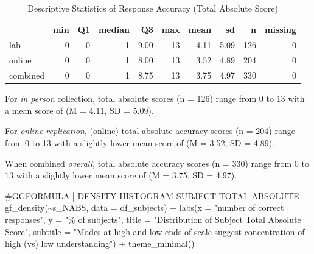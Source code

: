 \documentclass[
  letterpaper,
  DIV=11,
  numbers=noendperiod]{scrreprt}
\newenvironment{Shaded}{\begin{snugshade}}{\end{snugshade}}
\newcommand{\AttributeTok}[1]{\textcolor[rgb]{0.40,0.45,0.13}{#1}}
\newcommand{\CommentTok}[1]{\textcolor[rgb]{0.37,0.37,0.37}{#1}}
\newcommand{\FunctionTok}[1]{\textcolor[rgb]{0.28,0.35,0.67}{#1}}
\newcommand{\NormalTok}[1]{\textcolor[rgb]{0.00,0.23,0.31}{#1}}
\newcommand{\SpecialCharTok}[1]{\textcolor[rgb]{0.37,0.37,0.37}{#1}}
\newcommand{\StringTok}[1]{\textcolor[rgb]{0.13,0.47,0.30}{#1}}
\begin{document}
\begin{table}

\caption{Descriptive Statistics of Response Accuracy (Total Absolute Score)}
\centering
\begin{tabular}[t]{l|r|r|r|r|r|r|r|r|r}
\hline
  & min & Q1 & median & Q3 & max & mean & sd & n & missing\\
\hline
lab & 0 & 0 & 1 & 9.00 & 13 & 4.11 & 5.09 & 126 & 0\\
\hline
online & 0 & 0 & 1 & 8.00 & 13 & 3.52 & 4.89 & 204 & 0\\
\hline
combined & 0 & 0 & 1 & 8.75 & 13 & 3.75 & 4.97 & 330 & 0\\
\hline
\end{tabular}
\end{table}

For \emph{in person} collection, total absolute scores (n = 126) range
from 0 to 13 with a mean score of (M = 4.11, SD = 5.09).

For \emph{online replication}, (online) total absolute accuracy scores
(n = 204) range from 0 to 13 with a slightly lower mean score of (M =
3.52, SD = 4.89).

When combined \emph{overall}, total absolute accuracy scores (n = 330)
range from 0 to 13 with a slightly lower mean score of (M = 3.75, SD =
4.97).

\begin{Shaded}
\begin{Highlighting}[]
\CommentTok{\#GGFORMULA | DENSITY HISTOGRAM SUBJECT TOTAL ABSOLUTE}
\FunctionTok{gf\_density}\NormalTok{(}\SpecialCharTok{\textasciitilde{}}\NormalTok{s\_NABS, }\AttributeTok{data =}\NormalTok{ df\_subjects) }\SpecialCharTok{+}
  \FunctionTok{labs}\NormalTok{(}\AttributeTok{x =} \StringTok{"number of correct responses"}\NormalTok{,}
       \AttributeTok{y =} \StringTok{"\% of subjects"}\NormalTok{,}
       \AttributeTok{title =} \StringTok{"Distribution of Subject Total Absolute Score"}\NormalTok{,}
       \AttributeTok{subtitle =} \StringTok{"Modes at high and low ends of scale suggest concentration of high (vs) low understanding"}\NormalTok{) }\SpecialCharTok{+} 
  \FunctionTok{theme\_minimal}\NormalTok{()}
\end{Highlighting}
\end{Shaded}
\end{document}
